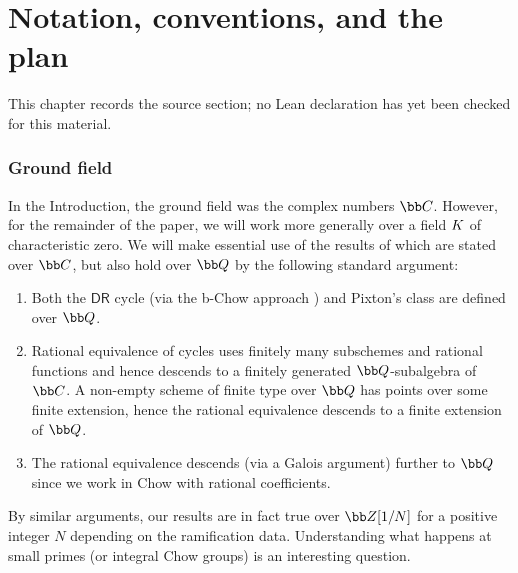 \chapter{Notation, conventions, and the plan}
\label{pixtons-formula-abel-jacobi-picard-stack-chapter-02}

\begin{remark}
\label{pixtons-formula-abel-jacobi-picard-stack-chapter-02-source}
This chapter records the source section; no Lean declaration has yet been checked for this material.
\notready
\end{remark}

\subsection{Ground field}



In the Introduction, the ground field
was the complex numbers $\bb C$. However, for the remainder of the paper,
we will work more generally over a field ${K}$ of characteristic zero.
We will make essential use of the results of \cite{Janda2018Double-ramifica} which are stated over $\bb C$,
but also
hold over $\bb Q$ by the following
standard argument:
\begin{enumerate}
\item[(i)] Both the $\mathsf{DR}$ cycle  (via the b-Chow approach \cite{Holmes2017Extending-the-d}) and Pixton's class are defined over $\bb Q$.
\item[(ii)] Rational equivalence of cycles uses finitely many subschemes and rational functions and  hence descends to a finitely generated
$\bb Q$-subalgebra of $\bb C$. A non-empty scheme of finite type over $\bb Q$ has points over some finite extension, hence the rational equivalence descends to a finite extension of $\bb Q$.
\item[(iii)]
The rational equivalence descends (via a Galois argument)
further to $\bb Q$ since we work in Chow with rational coefficients.
\end{enumerate}
By similar arguments,
our results are in fact true over $\bb Z[1/N]$ for a positive integer $N$ depending on the ramification data. Understanding what happens at small primes (or integral Chow groups)
is an interesting question.


